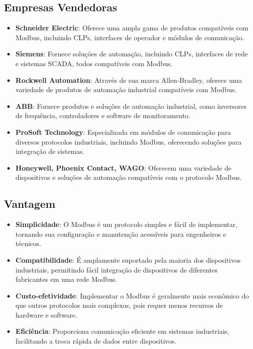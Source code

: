 \documentclass[a4paper,11pt]{article} %
\begin{document}
\subsection{Empresas Vendedoras}
\begin{itemize}
    \item \textbf{Schneider Electric}: Oferece uma ampla gama de produtos compatíveis com Modbus, incluindo CLPs, interfaces de operador e módulos de comunicação.
    \item \textbf{Siemens}: Fornece soluções de automação, incluindo CLPs, interfaces de rede e sistemas SCADA, todos compatíveis com Modbus.
    \item \textbf{Rockwell Automation}: Através de sua marca Allen-Bradley, oferece uma variedade de produtos de automação industrial compatíveis com Modbus.
    \item \textbf{ABB}: Fornece produtos e soluções de automação industrial, como inversores de frequência, controladores e software de monitoramento.
    \item \textbf{ProSoft Technology}: Especializada em módulos de comunicação para diversos protocolos industriais, incluindo Modbus, oferecendo soluções para integração de sistemas.
    \item \textbf{Honeywell, Phoenix Contact, WAGO}: Oferecem uma variedade de dispositivos e soluções de automação compatíveis com o protocolo Modbus.
\end{itemize}

\subsection{Vantagem}
\begin{itemize}
    \item \textbf{Simplicidade}: O Modbus é um protocolo simples e fácil de implementar, tornando sua configuração e manutenção acessíveis para engenheiros e técnicos.
    \item \textbf{Compatibilidade}: É amplamente suportado pela maioria dos dispositivos industriais, permitindo fácil integração de dispositivos de diferentes fabricantes em uma rede Modbus.
    \item \textbf{Custo-efetividade}: Implementar o Modbus é geralmente mais econômico do que outros protocolos mais complexos, pois requer menos recursos de hardware e software.
    \item \textbf{Eficiência}: Proporciona comunicação eficiente em sistemas industriais, facilitando a troca rápida de dados entre dispositivos.
\end{itemize}
\end{document}
